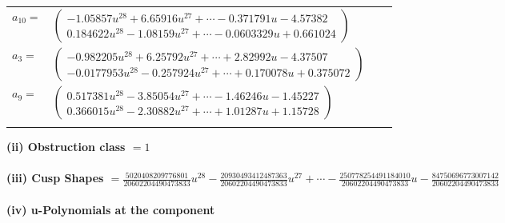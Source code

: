 \documentclass[1p]{elsarticle_modified}
\theoremstyle{definition}
\begin{document}
\begin{tabular}{m{7pt} m{180pt} m{7pt} m{180pt} }
\flushright $a_{10}=$&$\begin{pmatrix}-1.05857 u^{28}+6.65916 u^{27}+\cdots-0.371791 u-4.57382\\0.184622 u^{28}-1.08159 u^{27}+\cdots-0.0603329 u+0.661024\end{pmatrix}$ \\
\flushright $a_{3}=$&$\begin{pmatrix}-0.982205 u^{28}+6.25792 u^{27}+\cdots+2.82992 u-4.37507\\-0.0177953 u^{28}-0.257924 u^{27}+\cdots+0.170078 u+0.375072\end{pmatrix}$ \\
\flushright $a_{9}=$&$\begin{pmatrix}0.517381 u^{28}-3.85054 u^{27}+\cdots-1.46246 u-1.45227\\0.366015 u^{28}-2.30882 u^{27}+\cdots+1.01287 u+1.15728\end{pmatrix}$\\&\end{tabular}
\flushleft \textbf{(ii) Obstruction class $= 1$}\\~\\
\flushleft \textbf{(iii) Cusp Shapes $= \frac{5020408209776801}{20602204490473833} u^{28}-\frac{20930493412487363}{20602204490473833} u^{27}+\cdots-\frac{250778254491184010}{20602204490473833} u-\frac{84750696773007142}{20602204490473833}$}\\~\\
\newpage\renewcommand{\arraystretch}{1}
\flushleft \textbf{(iv) u-Polynomials at the component}\newline \\
\end{document}
